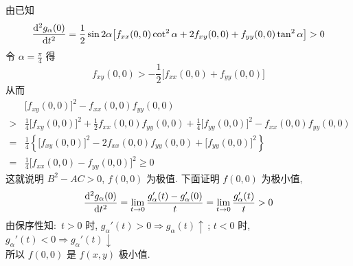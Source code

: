 \documentclass[11pt,twoside,space]{ctexart}
\begin{document}
由已知 \[\frac{\mathop{}\!\mathrm{d}^2 g_{\alpha}(0)}{\mathop{}\!\mathrm{d} t^2}=\frac{1}{2}\sin2\alpha\big[f_{xx}(0,0)\cot^2\alpha+2f_{xy}(0,0)+f_{yy}(0,0)\tan^2\alpha\big]>0\]
令 $\alpha=\frac{\pi}{4}$ 得
\[f_{xy}(0,0)>-\frac{1}{2}\big[f_{xx}(0,0)+f_{yy}(0,0)\big]\]
从而\vspace*{-1em}\begin{align*}
&\big[f_{xy}(0,0)\big]^2-f_{xx}(0,0)f_{yy}(0,0)\\
>&\frac{1}{4}\big[f_{xy}(0,0)\big]^2+\frac{1}{2}f_{xx}(0,0)f_{yy}(0,0)+\frac{1}{4}\big[f_{yy}(0,0)\big]^2-f_{xx}(0,0)f_{yy}(0,0)\\
=&\frac{1}{4}\left\{\big[f_{xy}(0,0)\big]^2-2f_{xx}(0,0)f_{yy}(0,0)+\big[f_{yy}(0,0)\big]^2\right\}\\
=&\frac{1}{4}\big[f_{xx}(0,0)-f_{yy}(0,0)\big]^2\geqslant0
\end{align*}
这就说明 $B^2-AC>0$, $f(0,0)$ 为极值. 下面证明 $f(0,0)$ 为极小值,
\[\frac{\mathop{}\!\mathrm{d}^2 g_{\alpha}(0)}{\mathop{}\!\mathrm{d} t^2}=\lim_{t\to0}\frac{g_{\alpha}'(t)-g_{\alpha}'(0)}{t}=\lim_{t\to0}\frac{g_{\alpha}'(t)}{t}>0\]
由保序性知:\, $t>0$ 时, $g_{\alpha}'(t)>0\Longrightarrow g_{\alpha}(t)\uparrow$\,;\;
$t<0$ 时, $g_{\alpha}'(t)<0\Longrightarrow g_{\alpha}'(t)\downarrow$\\
所以 $f(0,0)$ 是 $f(x,y)$ 极小值. %


\end{document}
